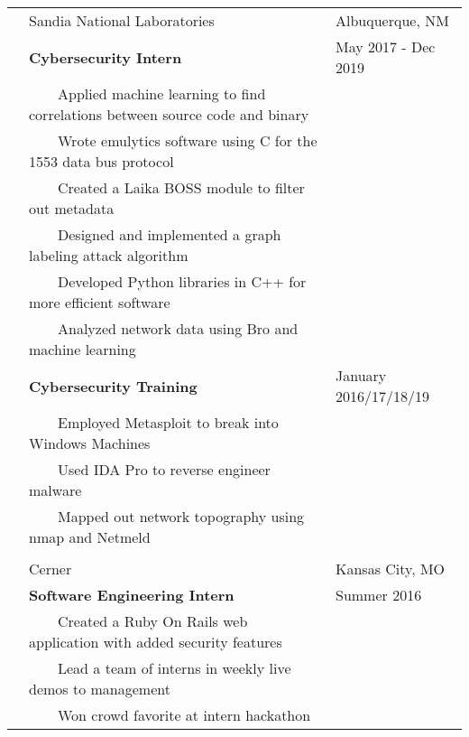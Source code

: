 \documentclass[10.5pt, arial]{article}
\newcommand{\tabitem}{~~\llap{\textbullet}~~}
\begin{document}
\begin{longtable}{p{1.5cm} p{13.2cm} l}
            & Sandia National Laboratories	& Albuquerque, NM 		\\
			& \textbf{Cybersecurity Intern}										& May 2017 - Dec 2019 	\\
			& \tabitem Applied machine learning to find correlations between source code and binary & 	\\
			& \tabitem Wrote emulytics software using C for the 1553 data bus protocol 	&			\\
			& \tabitem Created a Laika BOSS module to filter out metadata		&						\\
            & \tabitem Designed and implemented a graph labeling attack algorithm 	&     				\\
            & \tabitem Developed Python libraries in C++ for more efficient software 	& 				\\
            & \tabitem Analyzed network data using Bro and machine learning 			& 				\\
            & \textbf{Cybersecurity Training} 									& January 2016/17/18/19 \\
			& \tabitem Employed Metasploit to break into Windows Machines		&	 					\\
			& \tabitem Used IDA Pro to reverse engineer malware 				& 						\\
			& \tabitem Mapped out network topography using nmap and Netmeld		&						\\ \\
\pagebreak
			& Cerner 															& Kansas City, MO 		\\
			& \textbf{Software Engineering Intern} 								& Summer 2016			\\
			& \tabitem Created a Ruby On Rails web application with added security features	& 			\\
			& \tabitem Lead a team of interns in weekly live demos to management 			&    		\\
            & \tabitem Won crowd favorite at intern hackathon                   &                       \\
\end{longtable}
\end{document}
